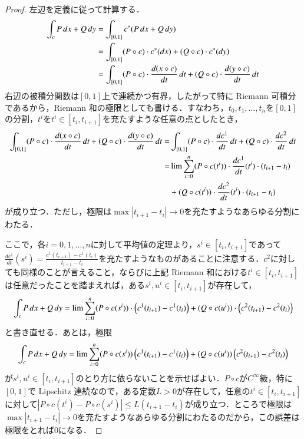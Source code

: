 \begin{proof}
左辺を定義に従って計算する．
\begin{align}
\int_c P \dif x + Q \dif y &= \int_{[0,1]} c^*(P \dif x + Q \dif y) \\
&= \int_{[0,1]} (P \circ c) \cdot c^*(\dif x) + (Q \circ c) \cdot c^*(\dif y) \\
&= \int_{[0,1]} (P \circ c) \cdot \frac{\dif (x \circ c)}{\dif t} \dif t + (Q \circ c) \cdot \frac{\dif (y \circ c)}{\dif t} \dif t \\
\end{align}
右辺の被積分関数は$[0,1]$上で連続かつ有界，したがって特に Riemann 可積分であるから，Riemann 和の極限としても書ける．すなわち，$t_0, t_1, \dots, t_n$を$[0,1]$の分割，$t^i$を$t^i \in [t_i, t_{i+1}]$を充たすような任意の点としたとき，
\begin{align}
\int_{[0,1]} (P \circ c) \cdot \frac{\dif (x \circ c)}{\dif t} \dif t + (Q \circ c) \cdot \frac{\dif (y \circ c)}{\dif t} \dif t =& \int_{[0,1]} (P \circ c) \cdot \frac{\dif c^1}{\dif t} \dif t + (Q \circ c) \cdot \frac{\dif c^2}{\dif t} \dif t \\
=& \lim \sum_{i=0}^n (P \circ c(t^i)) \cdot \frac{\dif c^1}{\dif t}(t^i) \cdot \left(t_{i+1} - t_{i} \right) \\
&+ (Q \circ c(t^i)) \cdot \frac{\dif c^2}{\dif t}(t^i) \cdot \left(t_{i+1} - t_{i} \right)
\end{align}が成り立つ．ただし，極限は$\max |t_{i+1} - t_i| \to 0$を充たすようなあらゆる分割にわたる．

ここで，各$i = 0,1, \dots, n$に対して平均値の定理より，$s^i \in [t_i, t_{i+1}]$であって$\frac{dc^1}{dt}(s^i) = \frac{c^1(t_{i+1}) - c^1(t_i)}{t_{i+1} - t_i}$を充たすようなものがあることに注意する．$c^2$に対しても同様のことが言えること，ならびに上記 Riemann 和における$t^i \in [t_i, t_{i+1}]$は任意だったことを踏まえれば，ある$s^i, u^i \in [t_i, t_{i+1}]$が存在して，
\begin{equation}
\int_c P \mathop{}\!d x + Q \mathop{}\!d y = \lim \sum_{i=0}^n (P \circ c(s^i)) \cdot \left(c^1(t_{i+1}) - c^1(t_{i})\right) + (Q \circ c(u^i)) \cdot \left(c^2(t_{i+1}) - c^2(t_{i})\right)\end{equation}
と書き直せる．あとは，極限
\begin{equation}
\int_c P \mathop{}\!d x + Q \mathop{}\!d y = \lim \sum_{i=0}^n (P \circ c(s^i)) \left(c^1(t_{i+1}) - c^1(t_{i})\right) + (Q \circ c(u^i)) \left(c^2(t_{i+1}) - c^2(t_{i})\right)
\end{equation}が$s^i, u^i \in [t_i, t_{i+1}]$のとり方に依らないことを示せばよい．$P \circ c$が$C^\infty$級，特に$[0,1]$で Lipschitz 連続なので，ある定数$L > 0$が存在して，任意の$t^i \in [t_i, t_{i+1}]$に対して$| P \circ c(t^i) - P \circ c(s^i) | \leq L (t_{i+1} - t_i)$が成り立つ．ところで極限は$\max |t_{i+1} - t_i| \to 0$を充たすようなあらゆる分割にわたるのだから，この誤差は極限をとれば0になる．
\end{proof}

